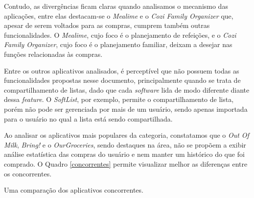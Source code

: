 Contudo, as divergências ficam claras quando analisamos o mecanismo das aplicações, entre elas destacam-se o \textit{Mealime} e o \textit{Cozi Family Organizer} que, apesar de serem voltados para as compras, cumprem também outras funcionalidades. O \textit{Mealime}, cujo foco é o planejamento de refeições, e o \textit{Cozi Family Organizer}, cujo foco é o planejamento familiar, deixam a desejar nas funções relacionadas às compras.

Entre os outros aplicativos analisados, é perceptível que não possuem todas as funcionalidades propostas nesse documento, principalmente quando se trata de compartilhamento de listas, dado	 que cada \textit{software} lida de modo diferente diante dessa \textit{feature}. O \textit{SoftList}, por exemplo, permite o compartilhamento de lista, porém não pode  ser gerenciada por mais de um usuário, sendo apenas importada para o usuário no qual a lista está sendo compartilhada.

Ao analisar os aplicativos mais populares da categoria, constatamos que o \textit{Out Of Milk}, \textit{Bring!} e o \textit{OurGroceries}, sendo destaques na área, não se propõem a exibir análise estatística das compras do usuário e nem manter um histórico do que foi comprado. O Quadro \ref{concorrentes} permite visualizar melhor as diferenças entre os concorrentes.

\begin{quadro}[h]
\caption{Uma comparação dos aplicativos concorrentes.}
\centering
  \label{concorrentes}
\end{quadro}
